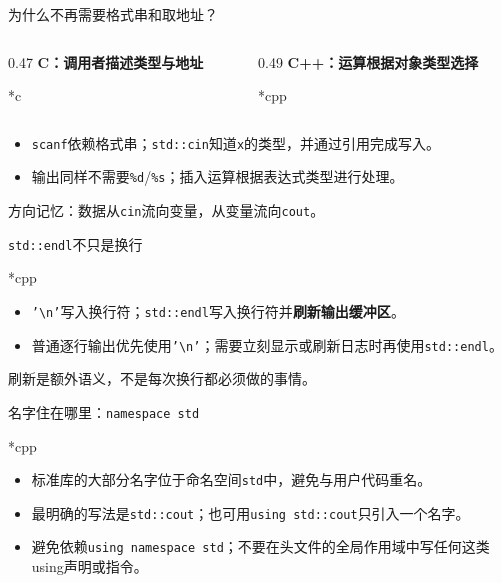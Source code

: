 \begin{frame}{为什么不再需要格式串和取地址？}
\begin{columns}[T]
\begin{column}{0.47\textwidth}
\textbf{C：调用者描述类型与地址}
\begin{Code}*{c}\end{Code}
\end{column}
\begin{column}{0.49\textwidth}
\textbf{C++：运算根据对象类型选择}
\begin{Code}*{cpp}\end{Code}
\end{column}
\end{columns}
\medskip
\begin{itemize}
\item \texttt{scanf}依赖格式串；\texttt{std::cin}知道\texttt{x}的类型，并通过引用完成写入。
\item 输出同样不需要\texttt{\%d}/\texttt{\%s}；插入运算根据表达式类型进行处理。
\end{itemize}
\alert{方向记忆：数据从\texttt{cin}流向变量，从变量流向\texttt{cout}。}
\end{frame}

\begin{frame}{\texttt{std::endl}不只是换行}
\begin{Code}*{cpp}\end{Code}
\begin{itemize}
\item \texttt{'\textbackslash n'}写入换行符；\texttt{std::endl}写入换行符并\textbf{刷新输出缓冲区}。
\item 普通逐行输出优先使用\texttt{'\textbackslash n'}；需要立刻显示或刷新日志时再使用\texttt{std::endl}。
\end{itemize}
\medskip
\alert{刷新是额外语义，不是每次换行都必须做的事情。}
\end{frame}

\begin{frame}{名字住在哪里：\texttt{namespace std}}
\begin{Code}*{cpp}\end{Code}
\begin{itemize}
\item 标准库的大部分名字位于命名空间\texttt{std}中，避免与用户代码重名。
\item 最明确的写法是\texttt{std::cout}；也可用\texttt{using std::cout}只引入一个名字。
\item 避免依赖\texttt{using namespace std}；\alert{不要在头文件的全局作用域中写任何这类using声明或指令}。
\end{itemize}
\end{frame}

